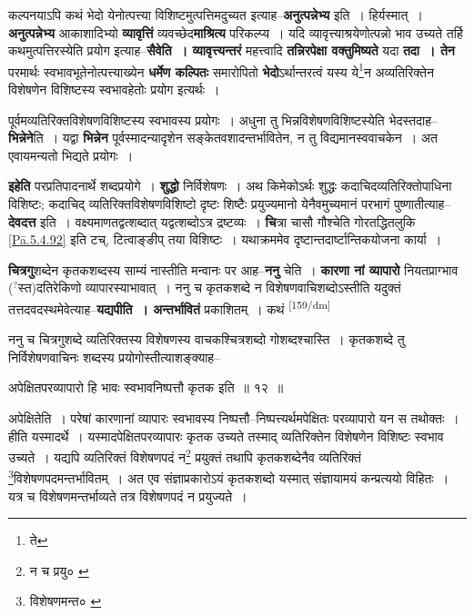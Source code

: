 \documentclass[article,12pt,a4paper]{memoir}
\newcommand{\unclear}[1]{($^{?}$#1)}
\begin{document}
	  \pstart कल्पनयाऽपि कथं भेदो येनोत्पत्त्या विशिष्टमुत्पत्तिमदुच्यत इत्याह--\textbf{अनुत्पन्नेभ्य} इति । हिर्यस्मात् । \textbf{अनुत्पन्नेभ्य} आकाशादिभ्यो \textbf{व्यावृत्तिं} व्यवच्छेद\textbf{माश्रित्य} परिकल्प्य । यदि व्यावृत्त्याश्रयेणोत्पन्नो भाव उच्यते तर्हि कथमुत्पत्तिरस्येति प्रयोग इत्याह--\textbf{सैवेति । व्यावृत्त्यन्तरं} महत्त्वादि \textbf{तन्निरपेक्षा वक्तुमिष्यते} यदा \textbf{तदा । तेन} परमार्थः स्वभावभूतेनोत्पत्त्याख्येन \textbf{धर्मेण कल्पितः} समारोपितो \textbf{भेदो}ऽर्थान्तरत्वं यस्य ये\footnote{ते}न अव्यतिरिक्तेन विशेषणेन विशिष्टस्य स्वभावहेतोः प्रयोग इत्यर्थः ।
	\pend
      

	  \pstart पूर्वमव्यतिरिक्तविशेषणविशिष्टस्य स्वभावस्य प्रयोगः । अधुना तु भिन्नविशेषणविशिष्टस्येति भेदस्तदाह--\textbf{भिन्नेने}ति । यद्वा \textbf{भिन्नेन} पूर्वस्मादन्यादृशेन सङ्केतवशादन्तर्भावितेन, न तु विद्यमानस्ववाचकेन । अत एवायमन्यतो भिद्यते प्रयोगः ।
	\pend
      

	  \pstart \textbf{इहेति} परप्रतिपादनार्थे शब्दप्रयोगे । \textbf{शुद्धो} निर्विशेषणः । अथ किमेकोऽर्थः शुद्धः कदाचिदव्यतिरिक्तोपाधिना विशिष्टः; कदाचिद् व्यतिरिक्तविशेषणविशिष्टो दृष्टः शिष्टैः प्रयुज्यमानो येनैवमुच्यमानं परभागं पुष्णातीत्याह--\textbf{देवदत्त} इति । वक्ष्यमाणतद्वत्शब्दात् यद्वत्शब्दोऽत्र द्रष्टव्यः । \textbf{चि}त्रा चासौ गौश्चेति गोरतद्धितलुकि \cref{Pā.5.4.92} इति टच्, टित्वाङ्ङीप् तया विशिष्टः । यथाक्रममेव दृष्टान्तदार्ष्टान्तिकयोजना कार्या ।
	\pend
      

	  \pstart \textbf{चित्रगु}शब्देन कृतकशब्दस्य साम्यं नास्तीति मन्वानः पर आह--\textbf{ननु} चेति । \textbf{कारणा नां व्यापारो} नियतप्राग्भाव \unclear{स्त}दतिरेकिणो व्यापारस्याभावात् । ननु च कृतकशब्दे न विशेषणवाचिशब्दोऽस्तीति यदुक्तं तत्तदवदस्थमेवेत्याह--\textbf{यद्यपीति । अन्तर्भावितं} प्रकाशितम् । कथं  \leavevmode\textsuperscript{\rmlatinfont\tiny [159/dm]} 
	  
	ननु च चित्रगुशब्दे व्यतिरिक्तस्य विशेषणस्य वाचकश्चित्रशब्दो गोशब्दश्चास्ति । कृतकशब्दे तु निर्विशेषणवाचिनः शब्दस्य प्रयोगोस्तीत्याशङ्क्याह-- 
	  
	अपेक्षितपरव्यापारो हि भावः स्वभावनिष्पत्तौ कृतक इति ॥ १२ ॥ 
	  
	अपेक्षितेति । परेषां कारणानां व्यापारः स्वभावस्य निष्पत्तौ--निष्पत्त्यर्थमपेक्षितः परव्यापारो यन स तथोक्तः । हीति यस्मादर्थे । यस्मादपेक्षितपरव्यापारः कृतक उच्यते तस्माद् व्यतिरिक्तेन विशेषणेन विशिष्टः स्वभाव उच्यते । यद्यपि व्यतिरिक्तं विशेषणपदं न\footnote{न च प्रयु० \cite{dp-msB}} प्रयुक्तं तथापि कृतकशब्देनैव व्यतिरिक्तं \footnote{विशेषणमन्त० \cite{dp-msA} \cite{dp-edP} \cite{dp-edH} \cite{dp-edN}}विशेषणपदमन्तर्भावितम् । अत एव संज्ञाप्रकारोऽयं कृतकशब्दो यस्मात् संज्ञायामयं कन्प्रत्ययो विहितः । यत्र च विशेषणमन्तर्भाव्यते तत्र विशेषणपदं न प्रयुज्यते । 
	  
\end{document}
